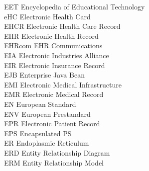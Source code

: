 \begin{tabbing}
    \>EET \>\>Encyclopedia of Educational Technology\\


    \>eHC \>\>Electronic Health Card\\

    \>EHCR \>\>Electronic Health Care Record\\

    \>EHR \>\>Electronic Health Record\\

    \>EHRcom \>\>EHR Communications\\

    \>EIA \>\>Electronic Industries Alliance\\


    \>EIR \>\>Electronic Insurance Record\\

    \>EJB \>\>Enterprise Java Bean\\


    \>EMI \>\>Electronic Medical Infrastructure\\

    \>EMR \>\>Electronic Medical Record\\

    \>EN \>\>European Standard\\

    \>ENV \>\>European Prestandard\\


    \>EPR \>\>Electronic Patient Record\\

    \>EPS \>\>Encapsulated PS\\

    \>ER \>\>Endoplasmic Reticulum\\

    \>ERD \>\>Entity Relationship Diagram\\

    \>ERM \>\>Entity Relationship Model\\


\end{tabbing}
